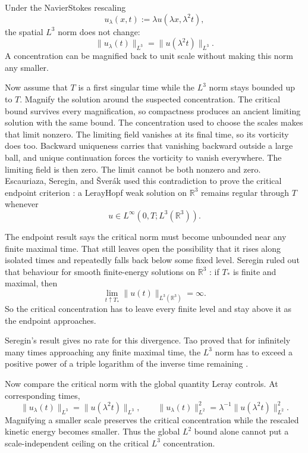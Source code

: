 Under the Navier\textendash Stokes rescaling
\begin{equation}\label{eq:HistoricalNavierStokesScaling}
  u_\lambda(x,t)
  :=
  \lambda u(\lambda x,\lambda^2t),
\end{equation}
the spatial \(L^3\) norm does not change:
\[
  \lVert u_\lambda(t)\rVert_{L^3}
  =
  \lVert u(\lambda^2t)\rVert_{L^3}.
\]
A concentration can be magnified back to unit scale without making this norm any smaller.

Now assume that \(T\) is a first singular time while the \(L^3\) norm stays bounded up to \(T\).
Magnify the solution around the suspected concentration.
The critical bound survives every magnification, so compactness produces an ancient limiting solution with the same bound.
The concentration used to choose the scales makes that limit nonzero.
The limiting field vanishes at its final time, so its vorticity does too.
Backward uniqueness carries that vanishing backward outside a large ball, and unique continuation forces the vorticity to vanish everywhere.
The limiting field is then zero.
The limit cannot be both nonzero and zero.
Escauriaza, Seregin, and \v{S}ver{\'a}k used this contradiction to prove the critical endpoint criterion \parencite{EscauriazaSereginSverak2003}: a Leray\textendash Hopf weak solution on \(\mathbb R^3\) remains regular through \(T\) whenever
\[
  u\in L^\infty(0,T;L^3(\mathbb R^3)).
\]

The endpoint result says the critical norm must become unbounded near any finite maximal time.
That still leaves open the possibility that it rises along isolated times and repeatedly falls back below some fixed level.
Seregin ruled out that behaviour for smooth finite-energy solutions on \(\mathbb R^3\) \parencite{Seregin2012}: if \(T_*\) is finite and maximal, then
\begin{equation}\label{eq:SereginLThreeDivergence}
  \lim_{t\uparrow T_*}\lVert u(t)\rVert_{L^3(\mathbb R^3)}
  =\infty.
\end{equation}
So the critical concentration has to leave every finite level and stay above it as the endpoint approaches.

Seregin's result gives no rate for this divergence.
Tao proved that for infinitely many times approaching any finite maximal time, the \(L^3\) norm has to exceed a positive power of a triple logarithm of the inverse time remaining \parencite{Tao2021Quantitative}.


Now compare the critical norm with the global quantity Leray controls.
At corresponding times,
\[
  \lVert u_\lambda(t)\rVert_{L^3}
  =
  \lVert u(\lambda^2t)\rVert_{L^3},
  \qquad
  \lVert u_\lambda(t)\rVert_{L^2}^{2}
  =
  \lambda^{-1}\lVert u(\lambda^2t)\rVert_{L^2}^{2}.
\]
Magnifying a smaller scale preserves the critical concentration while the rescaled kinetic energy becomes smaller.
Thus the global \(L^2\) bound alone cannot put a scale-independent ceiling on the critical \(L^3\) concentration.

